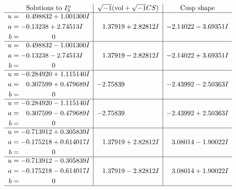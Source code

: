 \documentclass[1p]{elsarticle_modified}
\theoremstyle{definition}
\newcommand{\I}{\sqrt{-1}}
\begin{document}
$$\begin{array}{c|c|c}  
\text{Solutions to }I^u_{3}& \I (\text{vol} + \sqrt{-1}CS) & \text{Cusp shape}\\
 \hline 
\begin{aligned}
u &= \phantom{-}0.498832 + 1.001300 I \\
a &= -0.13238 + 2.74513 I \\
b &= \phantom{-0.000000 } 0\end{aligned}
 & \phantom{-}1.37919 + 2.82812 I & -2.14022 - 3.69351 I \\ \hline\begin{aligned}
u &= \phantom{-}0.498832 - 1.001300 I \\
a &= -0.13238 - 2.74513 I \\
b &= \phantom{-0.000000 } 0\end{aligned}
 & \phantom{-}1.37919 - 2.82812 I & -2.14022 + 3.69351 I \\ \hline\begin{aligned}
u &= -0.284920 + 1.115140 I \\
a &= \phantom{-}0.307599 + 0.479689 I \\
b &= \phantom{-0.000000 } 0\end{aligned}
 & -2.75839\phantom{ +0.000000I} & -2.43992 - 2.50363 I \\ \hline\begin{aligned}
u &= -0.284920 - 1.115140 I \\
a &= \phantom{-}0.307599 - 0.479689 I \\
b &= \phantom{-0.000000 } 0\end{aligned}
 & -2.75839\phantom{ +0.000000I} & -2.43992 + 2.50363 I \\ \hline\begin{aligned}
u &= -0.713912 + 0.305839 I \\
a &= -0.175218 + 0.614017 I \\
b &= \phantom{-0.000000 } 0\end{aligned}
 & \phantom{-}1.37919 + 2.82812 I & \phantom{-}3.08014 - 1.90022 I \\ \hline\begin{aligned}
u &= -0.713912 - 0.305839 I \\
a &= -0.175218 - 0.614017 I \\
b &= \phantom{-0.000000 } 0\end{aligned}
 & \phantom{-}1.37919 - 2.82812 I & \phantom{-}3.08014 + 1.90022 I\\
 \hline 
 \end{array}$$\newpage
\end{document}

